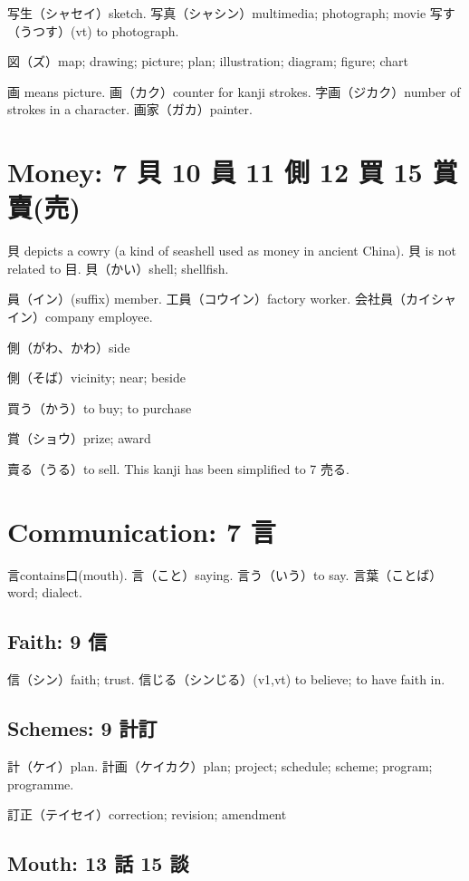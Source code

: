 写生（シャセイ）sketch.
写真（シャシン）multimedia; photograph; movie
写す（うつす）(vt) to photograph.

図（ズ）map; drawing; picture; plan; illustration; diagram; figure; chart

画 means picture.
画（カク）counter for kanji strokes.
字画（ジカク）number of strokes in a character.
画家（ガカ）painter.

\section{Money: 7 貝 10 員 11 側 12 買 15 賞賣(売)}

貝 depicts a cowry (a kind of seashell used as money in ancient China).
貝 is not related to 目.
貝（かい）shell; shellfish.

員（イン）(suffix) member.
工員（コウイン）factory worker.
会社員（カイシャイン）company employee.

側（がわ、かわ）side

側（そば）vicinity; near; beside

買う（かう）to buy; to purchase

賞（ショウ）prize; award

賣る（うる）to sell.
This kanji has been simplified to 7 売る.

\section{Communication: 7 言}

言contains口(mouth).
言（こと）saying.
言う（いう）to say.
言葉（ことば）word; dialect.

\subsection{Faith: 9 信}

信（シン）faith; trust.
信じる（シンじる）(v1,vt) to believe; to have faith in.

\subsection{Schemes: 9 計訂}

計（ケイ）plan.
計画（ケイカク）plan; project; schedule; scheme; program; programme.

訂正（テイセイ）correction; revision; amendment

\subsection{Mouth: 13 話 15 談}

